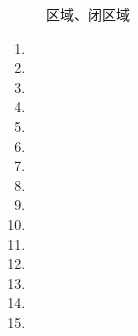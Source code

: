 \documentclass[12pt,UTF8]{ctexart}
\begin{document}
\begin{enumerate}
\begin{enumerate}
\begin{figure}[H]
\begin{center}
\end{center}
\caption{区域、闭区域}
\end{figure}
\end{enumerate}
\begin{enumerate}
\item[]
\item[]
\item[]
\item[]
\item[]
\item[]
\item[]
\item[]
\item[]
\item[]
\item[]
\item[]
\item[]
\item[]
\item[]
\end{enumerate}
\begin{figure}[H]
\begin{center}

\end{center}
\end{figure}
\end{enumerate}
\end{document}
